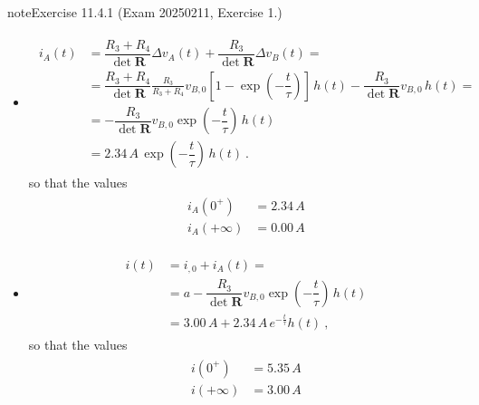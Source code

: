 \documentclass[letterpaper,10pt,english]{jupyterBook}
\begin{document}
\begin{sphinxadmonition}{note}{Exercise 11.4.1 (Exam 2025\sphinxhyphen{}02\sphinxhyphen{}11, Exercise 1.)}
\begin{itemize}
\begin{equation*}
\end{equation*}
\item {} 
\sphinxAtStartPar
{}
\begin{equation*}
\begin{split}\begin{aligned}
     i_A(t)
     & = \dfrac{R_3+R_4}{\det \mathbf{R}} \Delta v_A(t) + \dfrac{R_3}{\det \mathbf{R}} \Delta v_B(t) = \\
     & = \dfrac{R_3+R_4}{\det \mathbf{R}} \frac{R_3}{R_3 + R_4} v_{B,0} \left[ 1 - \exp\left( - \dfrac{t}{\tau} \right) \right] \, h(t) - \dfrac{R_3}{\det \mathbf{R}} v_{B,0} \, h(t) = \\
     & = - \dfrac{R_3}{\det \mathbf{R}} v_{B,0} \exp\left( - \dfrac{t}{\tau} \right) \, h(t) \\
     & = 2.34 \, A \, \exp\left( - \dfrac{t}{\tau} \right) \, h(t) \ .
   \end{aligned}\end{split}
\end{equation*}
\sphinxAtStartPar
so that the values
\begin{equation*}
\begin{split}\begin{aligned}
     i_A(0^+)     & = 2.34 \, A \\
     i_A(+\infty) & = 0.00 \, A
   \end{aligned}\end{split}
\end{equation*}
\item {} 
\sphinxAtStartPar
{}
\begin{equation*}
\begin{split}\begin{aligned}
     i(t) 
     & = i_{,0} + i_A(t) = \\
     & = a - \dfrac{R_3}{\det \mathbf{R}} v_{B,0} \exp\left( - \dfrac{t}{\tau} \right) \, h(t) \\
     & = 3.00 \, A + 2.34 \, A \, e^{-\frac{t}{\tau}} h(t) \ ,
   \end{aligned}\end{split}
\end{equation*}
\sphinxAtStartPar
so that the values
\begin{equation*}
\begin{split}\begin{aligned}
     i(0^+)     & = 5.35 \, A \\
     i(+\infty) & = 3.00 \, A
   \end{aligned}\end{split}
\end{equation*}
\end{itemize}


\end{sphinxadmonition}
\end{document}
